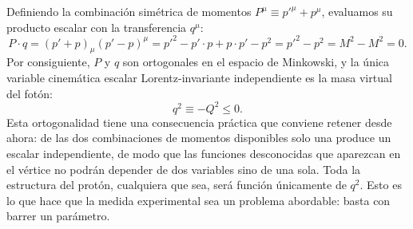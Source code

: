 \documentclass[10pt,a4paper]{article}
\begin{document}
Definiendo la combinación simétrica de momentos $P^\mu \equiv p'^\mu + p^\mu$, evaluamos su producto escalar con la transferencia $q^\mu$:
\begin{equation}
P \cdot q = (p' + p)_\mu (p' - p)^\mu = p'^2 - p' \cdot p + p \cdot p' - p^2 = p'^2 - p^2 = M^2 - M^2 = 0.
\label{eq:P_dot_q_zero}
\end{equation}
Por consiguiente, $P$ y $q$ son ortogonales en el espacio de Minkowski, y la única variable cinemática escalar Lorentz-invariante independiente es la masa virtual del fotón:
\begin{equation}
q^2 \equiv -Q^2 \le 0.
\end{equation}
Esta ortogonalidad tiene una consecuencia práctica que conviene retener desde ahora: de las dos combinaciones de momentos disponibles solo una produce un escalar independiente, de modo que las funciones desconocidas que aparezcan en el vértice no podrán depender de dos variables sino de una sola. Toda la estructura del protón, cualquiera que sea, será función únicamente de $q^2$. Esto es lo que hace que la medida experimental sea un problema abordable: basta con barrer un parámetro.
\end{document}

